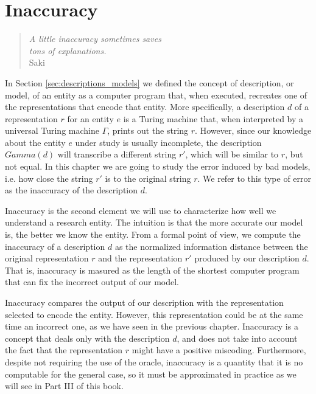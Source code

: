 %
%


\chapter{Inaccuracy}
\label{chap:Error}

\begin{quote}
\begin{flushright}
\emph{A little inaccuracy sometimes saves\\
tons of explanations.}\\
Saki
\end{flushright}
\end{quote}
\bigskip

In Section \ref{sec:descriptions_models} we defined the concept of description, or model, of an entity as a computer program that, when executed, recreates one of the representations that encode that entity. More specifically, a description $d$ of a representation $r$ for an entity $e$ is a Turing machine that, when interpreted by a universal Turing machine $\Gamma$, prints out the string $r$. However, since our knowledge about the entity $e$ under study is usually incomplete, the description $Gamma(d)$ will transcribe a different string $r'$, which will be similar to $r$, but not equal. In this chapter we are going to study the error induced by bad models, i.e. how close the string $r'$ is to the original string $r$. We refer to this type of error as the inaccuracy of the description $d$.

Inaccuracy is the second element we will use to characterize how well we understand a research entity. The intuition is that the more accurate our model is, the better we know the entity. From a formal point of view, we compute the inaccuracy of a description $d$ as the normalized information distance between the original representation $r$ and the representation $r'$ produced by our description $d$. That is, inaccuracy is masured as the length of the shortest computer program that can fix the incorrect output of our model.

Inaccuracy compares the output of our description with the representation selected to encode the entity. However, this representation could be at the same time an incorrect one, as we have seen in the previous chapter. Inaccuracy is a concept that deals only with the description $d$, and does not take into account the fact that the representation $r$ might have a positive miscoding. Furthermore, despite not requiring the use of the oracle, inaccuracy is a quantity that it is no computable for the general case, so it must be approximated in practice as we will see in Part III of this book.

